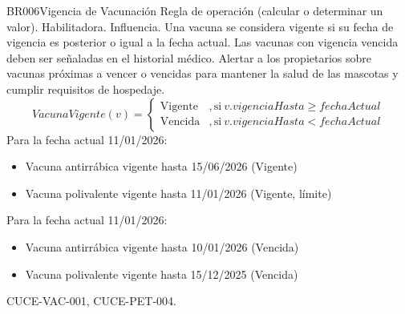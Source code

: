 \begin{BussinesRule}{BR006}{Vigencia de Vacunación}
	\BRitem[Tipo:] Regla de operación (calcular o determinar un valor).
	\BRitem[Clase:] Habilitadora.
	\BRitem[Nivel:] Influencia.
	\BRitem[Descripción:] Una vacuna se considera vigente si su fecha de vigencia es posterior o igual a la fecha actual. Las vacunas con vigencia vencida deben ser señaladas en el historial médico.
	\BRitem[Motivación:] Alertar a los propietarios sobre vacunas próximas a vencer o vencidas para mantener la salud de las mascotas y cumplir requisitos de hospedaje.
	\BRitem[Sentencia:] 
		\begin{displaymath}
			VacunaVigente(v) = \left\{ \begin{array}{ll}
			\textrm{Vigente} & , \textrm{si}~v.vigenciaHasta \geq fechaActual\\
			\textrm{Vencida} & , \textrm{si}~v.vigenciaHasta < fechaActual
			\end{array} \right.
		\end{displaymath}
	 Para la fecha actual 11/01/2026:
		\begin{itemize}
			\item Vacuna antirrábica vigente hasta 15/06/2026 (Vigente)
			\item Vacuna polivalente vigente hasta 11/01/2026 (Vigente, límite)
		\end{itemize}
	 Para la fecha actual 11/01/2026:
		\begin{itemize}
			\item Vacuna antirrábica vigente hasta 10/01/2026 (Vencida)
			\item Vacuna polivalente vigente hasta 15/12/2025 (Vencida)
		\end{itemize}
	 CUCE-VAC-001, CUCE-PET-004.
\end{BussinesRule}

